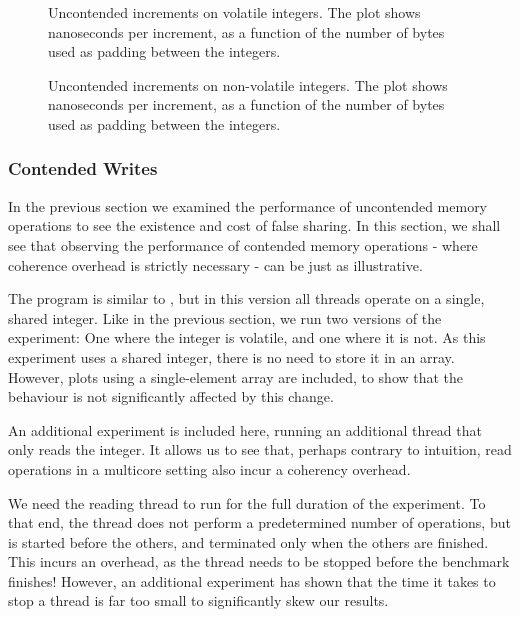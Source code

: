 \begin{figure}[hbpt]
\graphicspath{{plots/}}

\caption{Uncontended increments on volatile integers. The plot shows nanoseconds
	per increment, as a function of the number of bytes used as padding
	between the integers.}
	\label{fig:uncont-nob}
\end{figure}

\begin{figure}[hbpt]
\graphicspath{{plots/}}

\caption{Uncontended increments on non-volatile integers. The plot shows nanoseconds
	per increment, as a function of the number of bytes used as padding
	between the integers.}
\label{fig:uncont}
\end{figure}


\subsubsection{Contended Writes}

In the previous section we examined the performance of uncontended memory
operations to see the existence and cost of false sharing. In this section, we
shall see that observing the performance of contended memory operations - where
coherence overhead is strictly necessary - can be just as illustrative.


The program is similar to , but in this version all threads operate on a single, shared integer. Like in the previous
section, we run two versions of the experiment: One where the integer is
volatile, and one where it is not. As this experiment uses a shared integer,
there is no need to store it in an array. However, plots using a single-element
array are included, to show that the behaviour is not significantly affected by
this change.

An additional experiment is included here, running an additional thread that
only reads the integer. It allows us to see that, perhaps contrary to intuition,
read operations in a multicore setting also incur a coherency overhead.


We need the reading thread to run for the full duration of the experiment. To
that end, the thread does not perform a predetermined number of operations, but
is started before the others, and terminated only when the others are
finished. This incurs an overhead, as the thread needs to be stopped before the
benchmark finishes! However, an additional experiment has shown that the time it
takes to stop a thread is far too small to significantly skew our results.


